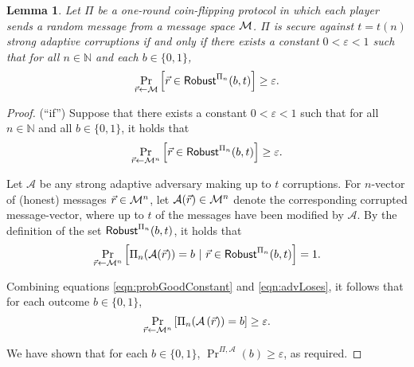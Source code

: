 \documentclass[11pt,letterpaper]{article}
\theoremstyle{plain}
\newtheorem{lemma}[theorem]{Lemma}
\theoremstyle{definition}
\newcommand{\NN}{\mathbb{N}}
\newcommand{\larr}{\leftarrow}
\newcommand{\eps}{\varepsilon}
\newcommand{\Adv}{\mathcal{A}}
\newcommand{\cM}{{\cal M}}
\begin{document}
\begin{lemma}\label{lem:robustSets}
Let $\Pi$ be a one-round coin-flipping protocol in which each player sends a random message from a message space $\cM$.
$\Pi$ is secure against $t=t(n)$ strong adaptive corruptions if and only if
there exists a constant $0<\eps<1$ such that for all $n\in\NN$ and each $b\in\{0,1\}$,
$$\Pr_{\vec{r}\larr\cM}\left[\vec{r}\in\Robust^{\Pi_n}(b,t)\right]\geq\eps.$$
\end{lemma}
\begin{proof}
{\sc (``if'')}
Suppose that there exists a constant $0<\eps<1$ such that for all $n\in\NN$ and all $b\in\{0,1\}$, it holds that
\begin{align}\label{eqn:probGoodConstant}
\Pr_{\vec{r}\larr\cM^n}\left[\vec{r}\in\Robust^{\Pi_n}(b,t)\right]\geq\eps.
\end{align}


Let $\Adv$ be any strong adaptive adversary making up to $t$ corruptions.
For $n$-vector of (honest) messages $\vec{r}\in\cM^n$, let $\Adv(\vec{r})\in\cM^n$ denote the 
corresponding corrupted message-vector, where up to $t$ of the messages have been modified by $\Adv$.
By the definition of the set ${\sf Robust}^{\Pi_n}(b,t)$, 
it holds that
\begin{align}\label{eqn:advLoses}
\Pr_{\vec{r}\larr\cM^n}\left[\Pi_n(\Adv(\vec{r}))=b ~|~ \vec{r}\in\Robust^{\Pi_n}(b,t)\right]=1.
\end{align}

Combining equations \eqref{eqn:probGoodConstant} and \eqref{eqn:advLoses}, it follows that for each outcome $b\in\{0,1\}$,
$$
\Pr_{\vec{r}\larr\cM^n}\left[\Pi_n(\Adv\left(\vec{r})\right)=b\right]\geq\eps.
$$

We have shown that for each $b\in\{0,1\}$, $\Pr^{\Pi,\Adv}(b)\geq\eps$, as required. 


\end{proof}
\end{document}
